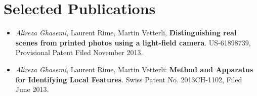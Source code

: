 \documentclass[11pt,a4paper,sans]{moderncv}        %
\begin{document}
\section{Selected Publications}
{
\begin{itemize}
\item \textit{Alireza Ghasemi}, Laurent Rime, Martin Vetterli, \textbf{Distinguishing real scenes from printed photos using a light-field camera}. US-61898739, Provisional Patent Filed November 2013.
\item \textit{Alireza Ghasemi}, Laurent Rime, Martin Vetterli:\textbf{ Method and Apparatus for Identifying Local Features}. Swiss Patent No. 2013CH-1102, Filed June 2013. 
\end{itemize}
\vspace*{5pt}
}
\end{document}
